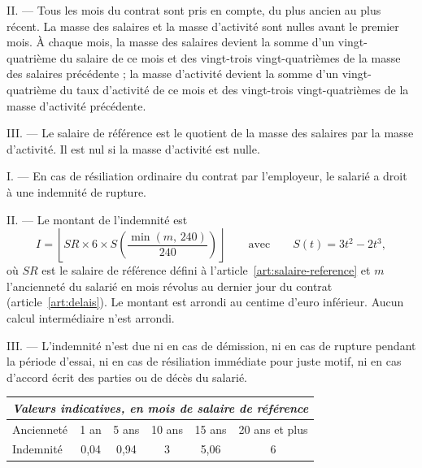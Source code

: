 II. --- Tous les mois du contrat sont pris en compte, du plus ancien au plus
récent. La masse des salaires et la masse d'activité sont nulles avant le
premier mois. À chaque mois, la masse des salaires devient la somme d'un
vingt-quatrième du salaire de ce mois et des vingt-trois vingt-quatrièmes de la
masse des salaires précédente ; la masse d'activité devient la somme d'un
vingt-quatrième du taux d'activité de ce mois et des vingt-trois
vingt-quatrièmes de la masse d'activité précédente.

III. --- Le salaire de référence est le quotient de la masse des salaires par la
masse d'activité. Il est nul si la masse d'activité est nulle.

\label{art:indemnite}
I. --- En cas de résiliation ordinaire du contrat par l'employeur, le
salarié a droit à une indemnité de rupture.

II. --- Le montant de l'indemnité est
\[
  I = \left\lfloor SR \times 6 \times S\!\left(\frac{\min(m,\,240)}{240}\right) \right\rfloor
  \qquad\text{avec}\qquad S(t) = 3t^2 - 2t^3,
\]
où $SR$ est le salaire de référence défini à l'article~\ref{art:salaire-reference}
et $m$ l'ancienneté du salarié en mois révolus au dernier jour du contrat
(article~\ref{art:delais}).
Le montant est arrondi au centime d'euro inférieur. Aucun calcul intermédiaire
n'est arrondi.

III. --- L'indemnité n'est due ni en cas de démission, ni en cas de rupture
pendant la période d'essai, ni en cas de résiliation immédiate pour juste motif,
ni en cas d'accord écrit des parties ou de décès du salarié.

\begin{center}
\footnotesize
\begin{tabular}{lccccc}
  \multicolumn{6}{c}{\textit{Valeurs indicatives, en mois de salaire de référence}} \\[0.3em]
  \hline
  Ancienneté & 1 an & 5 ans & 10 ans & 15 ans & 20 ans et plus \\
  Indemnité & 0,04 & 0,94 & 3 & 5,06 & 6 \\
  \hline
\end{tabular}
\end{center}
